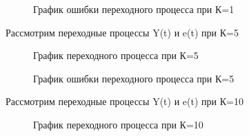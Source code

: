 \documentclass[a4paper, 11pt]{article}
\begin{document}
\begin{figure}[h!]
    \caption{График ошибки переходного процесса при К=1}
    \label{tree}
\end{figure}

\newpage

Рассмотрим переходные процессы Y(t) и e(t) при К=5

\begin{figure}[h!]
    \caption{График переходного процесса при К=5}
    \label{four}
\end{figure}

\begin{figure}[h!]
    \caption{График ошибки переходного процесса при К=5}
    \label{tree}
\end{figure}

Рассмотрим переходные процессы Y(t) и e(t) при К=10

\begin{figure}[h!]
    \caption{График переходного процесса при К=10}
    \label{four}
\end{figure}
\end{document}
